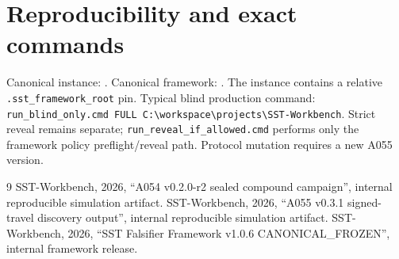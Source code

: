 \documentclass[11pt,a4paper]{article}
\newcommand{\code}[1]{\texttt{#1}}
\begin{document}
\section{Reproducibility and exact commands}
Canonical instance: . Canonical framework: . The instance contains a relative \code{.sst\_framework\_root} pin. Typical blind production command: \code{run\_blind\_only.cmd FULL C:\textbackslash workspace\textbackslash projects\textbackslash SST-Workbench}. Strict reveal remains separate; \code{run\_reveal\_if\_allowed.cmd} performs only the framework policy preflight/reveal path. Protocol mutation requires a new A055 version.
\begin{thebibliography}{9}
 SST-Workbench, 2026, ``A054 v0.2.0-r2 sealed compound campaign'', internal reproducible simulation artifact.
 SST-Workbench, 2026, ``A055 v0.3.1 signed-travel discovery output'', internal reproducible simulation artifact.
 SST-Workbench, 2026, ``SST Falsifier Framework v1.0.6 CANONICAL\_FROZEN'', internal framework release.
\end{thebibliography}
\end{document}
